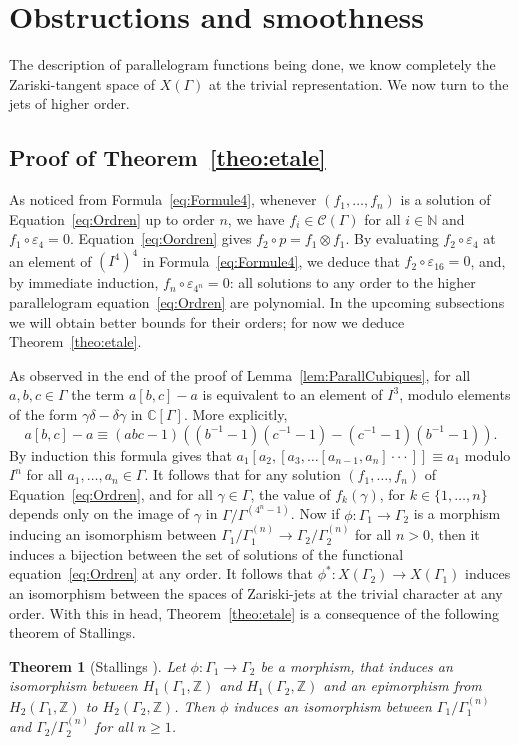 \documentclass[11pt]{article}
\let\mathcal\mathscr
\newtheorem{theorem}{Theorem}[section]
\theoremstyle{definition}
\newcommand{\ZZ}{\mathbb{Z}}
\newcommand{\NN}{\mathbb{N}}
\newcommand{\CC}{\mathbb{C}}
\begin{document}
\section{Obstructions and smoothness}

The description of parallelogram functions being done, we know completely
the Zariski-tangent space of $X(\Gamma)$ at the trivial representation.
We now turn to the jets of higher order.

\subsection{Proof of Theorem~\ref{theo:etale}}
As noticed from Formula~\eqref{eq:Formule4}, whenever $(f_1,\ldots,f_n)$
is a solution of Equation~\eqref{eq:Ordren} up to order $n$, we have
$f_i\in \mathcal{C}(\Gamma)$ for all $i\in\NN$ and $f_1\circ\varepsilon_4=0$.
Equation~\eqref{eq:Oordren} gives $f_2\circ p= f_1\otimes f_1$.
By evaluating $f_2\circ\varepsilon_4$ at
an element of $(I^4)^4$ in Formula~\eqref{eq:Formule4},
we deduce that $f_2\circ\varepsilon_{16}=0$, and,
by immediate induction, $f_n\circ\varepsilon_{4^n}=0$: all solutions to
any order to the higher parallelogram equation~\eqref{eq:Ordren} are
polynomial. In the upcoming subsections we will obtain better bounds for
their orders; for now we deduce Theorem~\ref{theo:etale}.

As observed in the end of the proof of Lemma~\ref{lem:ParallCubiques},
for all
$a,b,c\in\Gamma$ the term $a[b,c]-a$ is equivalent to an element of $I^3$,
modulo elements of the form $\gamma\delta-\delta\gamma$ in $\CC[\Gamma]$.
More explicitly,
\[ a[b,c] - a \equiv
(abc-1)\left((b^{-1}-1)(c^{-1}-1)-(c^{-1}-1)(b^{-1}-1)\right). \]
By induction this formula gives that $a_1[a_2,[a_3,\dots[a_{n-1},a_n]\cdot\cdot\cdot]]\equiv a_1$ modulo $I^n$ for all $a_1,\ldots,a_n\in\Gamma$. It follows that for any solution $(f_1,\ldots,f_n)$ of
Equation~\eqref{eq:Ordren}, and for all $\gamma\in\Gamma$, the value of
$f_k(\gamma)$, for $k\in\{1,\ldots,n\}$ depends only on the image of
$\gamma$ in $\Gamma/\Gamma^{(4^n-1)}$. Now if
$\phi\colon\Gamma_1\to\Gamma_2$ is a morphism inducing an isomorphism
between $\Gamma_1/\Gamma_1^{(n)}\to \Gamma_2/\Gamma_2^{(n)}$ for all $n>0$,
then it induces a bijection between the set of solutions of the functional
equation~\eqref{eq:Ordren} at any order. It follows that
$\phi^*:X(\Gamma_2)\to X(\Gamma_1)$ induces an isomorphism between the
spaces of Zariski-jets at the trivial character at any order. With this in
head, Theorem~\ref{theo:etale} is a consequence of the following theorem of Stallings.
\begin{theorem}[{Stallings \cite[Th.\,3.4]{Stallings}}]
Let $\phi\colon \Gamma_1\to \Gamma_2$ be a morphism, that induces an
isomorphism between $H_1(\Gamma_1,\ZZ)$ and $H_1(\Gamma_2,\ZZ)$ and an
epimorphism from $H_2(\Gamma_1,\ZZ)$ to $H_2(\Gamma_2,\ZZ)$.
Then $\phi$ induces an isomorphism between
$\Gamma_1/\Gamma_1^{(n)}$ and $\Gamma_2/\Gamma_2^{(n)}$ for all
$n\geq 1$.
\end{theorem}
\end{document}
